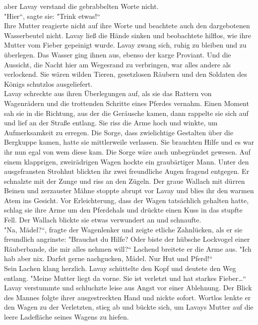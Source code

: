 aber Lavay verstand die gebrabbelten Worte nicht.\\
"Hier``, sagte sie: "Trink etwas!``\\
Ihre Mutter reagierte nicht auf ihre Worte und beachtete auch den dargebotenen Wasserbeutel nicht. 
Lavay ließ die Hände sinken und beobachtete hilflos, wie ihre Mutter vom Fieber gepeinigt wurde. 
Lavay zwang sich, ruhig zu bleiben und zu überlegen. Das Wasser ging ihnen aus, ebenso der karge 
Proviant. Und die Aussicht, die Nacht hier am Wegesrand zu verbringen, war alles andere als 
verlockend. Sie wären wilden Tieren, gesetzlosen Räubern und den Soldaten des Königs schutzlos 
ausgeliefert. \\

Lavay schreckte aus ihren Überlegungen auf, als sie das Rattern von Wagenrädern und die trottenden 
Schritte eines Pferdes vernahm. Einen Moment sah sie in die Richtung, aus der die Geräusche kamen, 
dann rappelte sie sich auf und lief an der Straße entlang. Sie riss die Arme hoch und winkte, um 
Aufmerksamkeit zu erregen. Die Sorge, dass zwielichtige Gestalten über die Bergkuppe kamen, hatte 
sie mittlerweile verlassen. Sie brauchten Hilfe und es war ihr nun egal von wem diese kam. Die 
Sorge wäre auch unbegründet gewesen. Auf einem klapprigen, zweirädrigen Wagen hockte ein 
graubärtiger Mann. Unter den ausgefransten Strohhut blickten ihr zwei freundliche Augen fragend 
entgegen. Er schnalzte mit der Zunge und riss an den Zügeln. Der graue Wallach mit dürren Beinen 
und zerzauster Mähne stoppte abrupt vor Lavay und blies ihr den warmen Atem ins Gesicht. Vor 
Erleichterung, dass der Wagen tatsächlich gehalten hatte, schlag sie ihre Arme um den Pferdehals 
und drückte einen Kuss in das stupfte Fell. Der Wallach blickte sie etwas verwundert an und 
schnaufte.\\
"Na, Mädel?``, fragte der Wagenlenker und zeigte etliche Zahnlücken, als er sie freundlich 
angrinste: "Brauchst du Hilfe? Oder biste der hübsche Lockvogel einer Räuberbande, die mir alles 
nehmen will?`` Lachend breitete er die Arme aus. "Ich hab aber nix. Darfst gerne nachgucken, Mädel. 
Nur Hut und Pferd!``\\
Sein Lachen klang herzlich. Lavay schüttelte den Kopf und deutete den Weg entlang. "Meine Mutter 
liegt da vorne. Sie ist verletzt und hat starkes Fieber…``\\
Lavay verstummte und schluchzte leise aus Angst vor einer Ablehnung. Der Blick des Mannes folgte 
ihrer ausgestreckten Hand und nickte sofort. Wortlos lenkte er den Wagen zu der Verletzten, stieg ab 
und bückte sich, um Lavays Mutter auf die leere Ladefläche seines Wagens zu hiefen.\\

